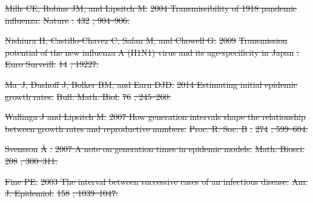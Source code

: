 \documentclass[12pt]{article}
\providecommand{\DIFdeltex}[1]{{\protect\color{red}\sout{#1}}}                      %
\providecommand{\DIFdel}[1]{\texorpdfstring{\DIFdeltex{#1}}{}} %
\begin{document}
\DIFdel{Mills CE, Robins JM, and Lipsitch M.
}%
\DIFdel{2004 Transmissibility of 1918 pandemic influenza.
}%
\DIFdel{Nature}%
\DIFdel{.
}%
\DIFdel{432}%
\DIFdel{, 904--906.
}%

\DIFdel{Nishiura H, Castillo-Chavez C, Safan M, and Chowell G.
}%
\DIFdel{2009 }%
\DIFdel{Transmission potential of the new influenza A (H1N1) virus and
  its age-specificity in Japan}%
\DIFdel{.
}%
\DIFdel{Euro Surveill.}%
\DIFdel{14}%
\DIFdel{, 19227.
}%

\DIFdel{Ma~J, Dushoff J, Bolker BM, and Earn DJD.
}%
\DIFdel{2014 Estimating initial epidemic growth rates.
}%
\DIFdel{Bull. Math. Biol.}%
\DIFdel{76}%
\DIFdel{, 245--260.
}%

\DIFdel{Wallinga J and Lipsitch M.
}%
\DIFdel{2007 How generation intervals shape the relationship between growth
  rates and reproductive numbers.
}%
\DIFdel{Proc. R. Soc. B}%
\DIFdel{.
}%
\DIFdel{274}%
\DIFdel{, 599--604.
}%

\DIFdel{Svensson }%
\DIFdel{\AA}%
\DIFdel{.
}%
\DIFdel{2007 A note on generation times in epidemic models.
}%
\DIFdel{Math. Biosci.}%
\DIFdel{208}%
\DIFdel{, 300--311.
}%

\DIFdel{Fine PE.
}%
\DIFdel{2003 The interval between successive cases of an infectious disease.
}%
\DIFdel{Am. J. Epidemiol.}%
\DIFdel{158}%
\DIFdel{, 1039--1047.
}%
\end{document}
